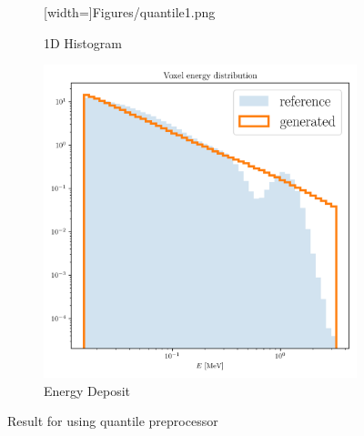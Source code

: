 \begin{figure}
\begin{subfigure}[b]{0.3\textwidth}
        [width=\textwidth]{Figures/quantile1.png}
        \caption{1D Histogram}
        \label{fig:quantile1}
    \end{subfigure}
    \hfill
    \begin{subfigure}[b]{0.3\textwidth}
        \centering
        \includegraphics[width=\textwidth]{Figures/quantile6.png}
        \caption{Energy Deposit}
        \label{fig:quantile6}
    \end{subfigure}
    \caption{Result for using quantile preprocessor}
\end{figure}


